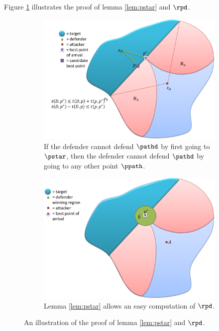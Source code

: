 Figure \ref{fig:lemma2} illustrates the proof of lemma \ref{lem:pstar} and $\rpd$.
\begin{figure}[h]
\centering
	\centering
	\begin{subfigure}{0.45\textwidth}
	\includegraphics[width=\textwidth]{"fig/pd proof 3"}
	\caption{If the defender cannot defend $\pathd$ by first going to $\pstar$, then the defender cannot defend $\pathd$ by going to any other point $\ppath$.}
	\end{subfigure} \quad
	\begin{subfigure}{0.45\textwidth}
	\centering
	\includegraphics[width=\textwidth]{"fig/pd proof 4"}
	\caption{Lemma \ref{lem:pstar} allows an easy computation of $\rpd$.}
	\end{subfigure}
	\caption{An illustration of the proof of lemma \ref{lem:pstar} and $\rpd$.}
	\label{fig:lemma2}
\end{figure}

